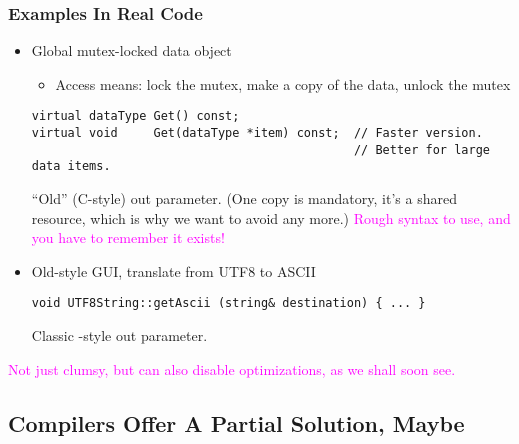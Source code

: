 \begin{frame}[fragile,t]
\frametitle{Examples In Real Code}

\begin{itemize}%

\item Global mutex-locked data object
\begin{itemize}
  \item Access means: lock the mutex, make a copy of the data, unlock
  the mutex
\end{itemize}
{\scriptsize
\begin{verbatim}
virtual dataType Get() const;
virtual void     Get(dataType *item) const;  // Faster version.
                                             // Better for large data items.
\end{verbatim}
}
``Old'' (C-style) out parameter.  (One copy is mandatory, it's a shared
resource, which is why we want to avoid any more.)
\textcolor{magenta}{Rough syntax to use, and you have to remember it exists!}

\vskip 12pt

\item Old-style GUI, translate from UTF8 to ASCII
{\scriptsize
\begin{verbatim}
void UTF8String::getAscii (string& destination) { ... }
\end{verbatim}
}
Classic \CC-style out parameter.

\vskip 12pt

\end{itemize}
\pause

{ \textcolor{magenta} {Not just clumsy, but can also disable
optimizations, as we shall soon see.}}


\end{frame}


\subsection[Compiler != Solution]{Compilers Offer A Partial Solution, Maybe}\lyxframeend{}


